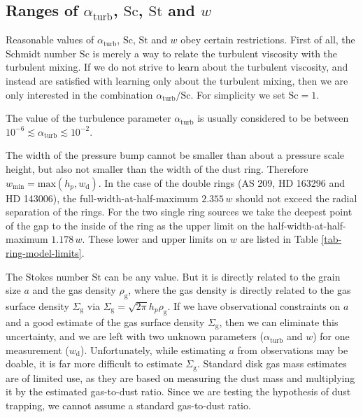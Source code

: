 \documentclass{aa}
\begin{document}
\subsection{Ranges of $\alpha_{\mathrm{turb}}$, $\mathrm{Sc}$, $\mathrm{St}$ and $w$}
\label{sec-ranges-of-params}
%
Reasonable values of $\alpha_{\mathrm{turb}}$, $\mathrm{Sc}$, $\mathrm{St}$ and
$w$ obey certain restrictions. First of all, the Schmidt number $\mathrm{Sc}$
is merely a way to relate the turbulent viscosity with the turbulent mixing. If
we do not strive to learn about the turbulent viscosity, and instead are
satisfied with learning only about the turbulent mixing, then we are only
interested in the combination $\alpha_{\mathrm{turb}}/\mathrm{Sc}$. For
simplicity we set $\mathrm{Sc}=1$.

The value of the turbulence parameter $\alpha_{\mathrm{turb}}$ is usually
considered to be between $10^{-6}\lesssim \alpha_{\mathrm{turb}}\lesssim
10^{-2}$.

The width of the pressure bump cannot be smaller than about a pressure
scale height, but also not smaller than the width of the dust ring.
Therefore $w_{\mathrm{min}}=\mathrm{max}(h_p,w_{\mathrm{d}})$.
In the case of the double rings (AS 209, HD 163296 and HD 143006),
the full-width-at-half-maximum $2.355\,w$ should not exceed the radial
separation of the rings. For the two single ring sources we take the deepest
point of the gap to the inside of the ring as the upper limit on the
half-width-at-half-maximum $1.178\,w$. These lower and upper limits on $w$
are listed in Table \ref{tab-ring-model-limits}.

The Stokes number $\mathrm{St}$ can be any value. But it is directly related to
the grain size $a$ and the gas density $\rho_{\mathrm{g}}$, where the gas
density is directly related to the gas surface density $\Sigma_{\mathrm{g}}$ via
$\Sigma_{\mathrm{g}}=\sqrt{2\pi}h_p\rho_{\mathrm{g}}$. If we have observational
constraints on $a$ and a good estimate of the gas surface density
$\Sigma_{\mathrm{g}}$, then we can eliminate this uncertainty, and we are left
with two unknown parameters ($\alpha_{\mathrm{turb}}$ and $w$) for one
measurement ($w_{\mathrm{d}}$).  Unfortunately, while estimating $a$ from
observations may be doable, it is far more difficult to estimate
$\Sigma_{\mathrm{g}}$. Standard disk gas mass estimates are of limited use, as
they are based on measuring the dust mass and multiplying it by the estimated
gas-to-dust ratio. Since we are testing the hypothesis of dust trapping, we
cannot assume a standard gas-to-dust ratio.
\end{document}
